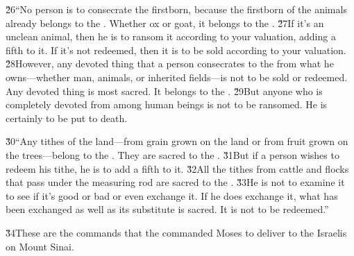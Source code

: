 \v{26}``No person is to consecrate the firstborn, because the firstborn of the animals already belongs to the . Whether ox or goat, it belongs to the . \v{27}If it's an unclean animal, then he is to ransom it according to your valuation, adding a fifth to it. If it's not redeemed, then it is to be sold according to your valuation. \v{28}However, any devoted thing that a person consecrates to the  from what he owns---whether man, animals, or inherited fields---is not to be sold or redeemed. Any devoted thing is most sacred. It belongs to the . \v{29}But anyone who is completely devoted from among human beings is not to be ransomed. He is certainly to be put to death.

\v{30}``Any tithes of the land---from grain grown on the land or from fruit grown on the trees---belong to the . They are sacred to the . \v{31}But if a person wishes to redeem his tithe, he is to add a fifth to it. \v{32}All the tithes from cattle and flocks that pass under the measuring rod are sacred to the . \v{33}He is not to examine it to see if it's good or bad or even exchange it. If he does exchange it, what has been exchanged as well as its substitute is sacred. It is not to be redeemed.''

\v{34}These are the commands that the  commanded Moses to deliver to the Israelis on Mount Sinai.
